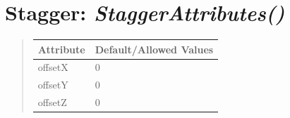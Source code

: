 \documentclass[letterpaper,10pt,english]{sphinxmanual}
\begin{document}
\section{\textbf{Stagger}: \emph{StaggerAttributes()}}
\label{attributes:stagger-staggerattributes}
\begin{DUlineblock}{0em}
\item[] 
\end{DUlineblock}
\begin{quote}

\begin{tabulary}{\linewidth}{|L|L|}
\hline

\textbf{Attribute}
 & 
\textbf{Default/Allowed Values}
\\
\hline
offsetX
 & 
0
\\
\hline
offsetY
 & 
0
\\
\hline
offsetZ
 & 
0
\\
\hline\end{tabulary}

\end{quote}

\begin{DUlineblock}{0em}
\item[] 
\end{DUlineblock}

\begin{DUlineblock}{0em}
\item[] 
\end{DUlineblock}
\end{document}
